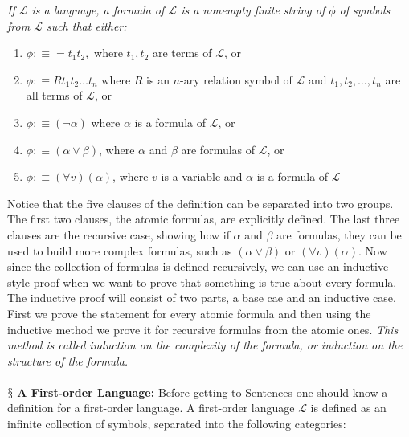 \documentclass[10pt,a4paper]{article}
\newcommand{\newpoint}[1]{\indent$\mathsection$ \textbf{#1}}
\newcommand{\curveL}{\mathcal{L}}
\begin{document}
                    \begin{define}
                        \textit{If $\curveL$ is a language, a formula of $\curveL$ is a nonempty finite string of $\phi$ of symbols from $\curveL$ such that either:}
                        \begin{enumerate}
                            \item $\phi :\equiv = t_1t_2,$ where $t_1, t_2$ are terms of $\curveL$, or 
                            \item $\phi :\equiv R t_1t_2\dots t_n$ where $R$ is an $n$-ary relation symbol of $\curveL$ and $t_1, t_2, \dots , t_n$ are all terms of $\curveL$, or 
                            \item $\phi :\equiv (\neg \alpha)$ where $\alpha$ is a formula of $\curveL$, or
                            \item $\phi:\equiv (\alpha\lor \beta)$, where $\alpha$ and $\beta$ are formulas of $\curveL$, or 
                            \item $\phi :\equiv (\forall v)(\alpha)$, where $v$ is a variable and $\alpha$ is a formula of $\curveL$
                        \end{enumerate}
                    \end{define}
                    Notice that the five clauses of the definition can be separated into two groups. The first two clauses, the atomic formulas, are explicitly defined. The last three clauses are the recursive case, showing how if $\alpha$ and $\beta$ are formulas, they can be used to build more complex formulas, such as $(\alpha\lor\beta)$ or $(\forall v)(\alpha)$.
                    Now since the collection of formulas is defined recursively, we can use an inductive style proof when we want to prove that something is true about every formula. The inductive proof will consist of two parts, a base cae and an inductive case. First we prove the statement for every atomic formula and then using the inductive method we prove it for recursive formulas from the atomic ones. \textit{This method is called induction on the complexity of the formula, or induction on the structure of the formula.}
                    \\
                    \\
                    \newpoint{A First-order Language:} Before getting to Sentences one should know a definition for a first-order language. A first-order language $\curveL$ is defined as an infinite collection of symbols, separated into the following categories:
\end{document}
